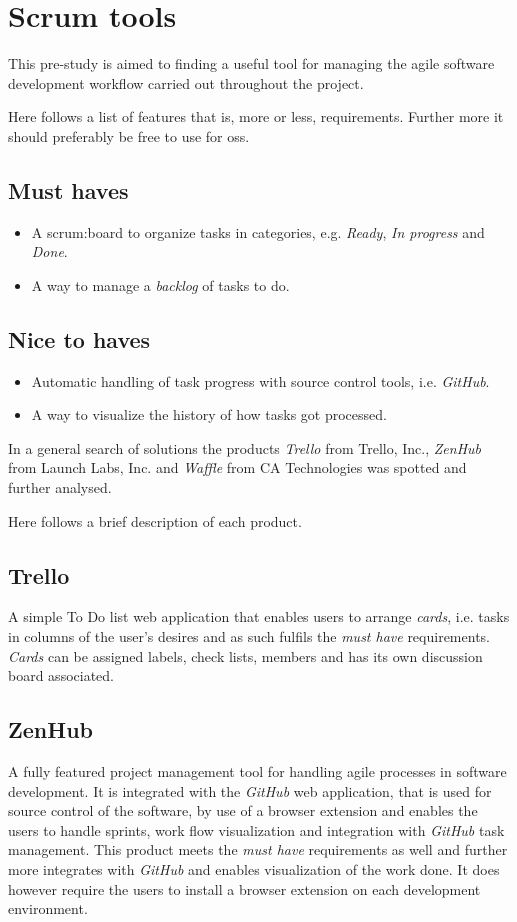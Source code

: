 \section{Scrum tools}\label{preStudy:scrum}
This pre-study is aimed to finding a useful tool for managing the agile software development workflow carried out throughout the project.

Here follows a list of features that is, more or less, requirements. Further more it should preferably be free to use for \gls{oss}.

\subsection*{Must haves}
\begin{itemize}
\item A \gls{scrum:board} to organize tasks in categories, e.g. \textit{Ready}, \textit{In progress} and \textit{Done}.
\item A way to manage a \textit{backlog} of tasks to do.
\end{itemize}

\subsection*{Nice to haves}
\begin{itemize}
\item Automatic handling of task progress with source control tools, i.e. \textit{GitHub}.
\item A way to visualize the history of how tasks got processed.
\end{itemize}

In a general search of solutions the products \textit{Trello} from Trello, Inc., \textit{ZenHub} from Launch Labs, Inc. and \textit{Waffle} from CA Technologies was spotted and further analysed.

Here follows a brief description of each product.

\subsection*{Trello}
A simple To Do list web application that enables users to arrange \textit{cards}, i.e. tasks in columns of the user’s desires and as such fulfils the \textit{must have} requirements.
\textit{Cards} can be assigned labels, check lists, members and has its own discussion board associated.

\subsection*{ZenHub}
A fully featured project management tool for handling agile processes in software development.
It is integrated with the \textit{GitHub} web application, that is used for source control of the software, by use of a browser extension and enables the users to handle sprints, work flow visualization and integration with \textit{GitHub} task management. 
This product meets the \textit{must have} requirements as well and further more integrates with \textit{GitHub} and enables visualization of the work done.
It does however require the users to install a browser extension on each development environment.

